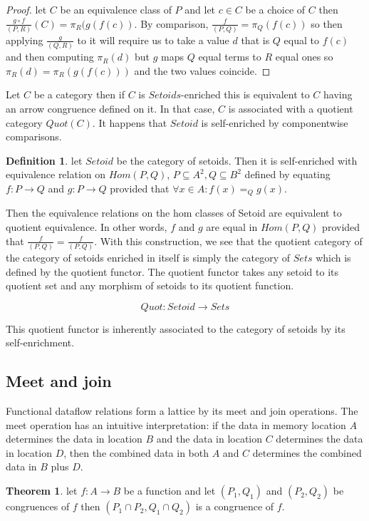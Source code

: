 \documentclass[a4paper,11pt, notitlepage]{report}
\theoremstyle{definition}
\newtheorem{definition}{Definition}[section]
\newtheorem{theorem}{Theorem}[section]
\begin{document}
\begin{proof}
let $C$ be an equivalence class of $P$ and let $c \in C$ be a choice of $C$ then $\frac{g \circ f}{(P,R)}(C) = \pi_R(g(f(c))$. By comparison, $\frac{f}{(P,Q)} = \pi_Q(f(c))$ so then applying $\frac{g}{(Q,R)}$ to it will require us to take a value $d$ that is $Q$ equal to $f(c)$ and then computing $\pi_R(d)$ but $g$ maps $Q$ equal terms to $R$ equal ones so $\pi_R(d) = \pi_R(g(f(c)))$ and the two values coincide.
\end{proof}

Let $C$ be a category then if $C$ is $Setoids$-enriched this is equivalent to $C$ having an arrow congruence defined on it. In that case, $C$ is associated with a quotient category $Quot(C)$. It happens that $Setoid$ is self-enriched by componentwise comparisons.

\begin{definition}
let $Setoid$ be the category of setoids. Then it is self-enriched with equivalence relation on $Hom(P,Q)$, $P \subseteq A^2, Q \subseteq B^2$ defined by equating $f: P \to Q$ and $g: P \to Q$ provided that $\forall x \in A : f(x) =_Q g(x)$.
\end{definition}

Then the equivalence relations on the hom classes of Setoid are equivalent to quotient equivalence. In other words, $f$ and $g$ are equal in $Hom(P,Q)$ provided that $\frac{f}{(P,Q)} = \frac{f}{(P,Q)}$. With this construction, we see that the quotient category of the category of setoids enriched in itself is simply the category of $Sets$ which is defined by the quotient functor. The quotient functor takes any setoid to its quotient set and any morphism of setoids to its quotient function.

\[ Quot : Setoid \to Sets \]

This quotient functor is inherently associated to the category of setoids by its self-enrichment.

\subsection{Meet and join}
Functional dataflow relations form a lattice by its meet and join operations. The meet operation has an intuitive interpretation: if the data in memory location $A$ determines the data in location $B$ and the data in location $C$ determines the data in location $D$, then the combined data in both $A$ and $C$ determines the combined data in $B$ plus $D$.

\begin{theorem}
let $f: A \to B$ be a function and let $(P_1,Q_1)$ and $(P_2,Q_2)$ be congruences of $f$ then $(P_1 \cap P_2, Q_1 \cap Q_2)$ is a congruence of $f$.
\end{theorem}
\end{document}
